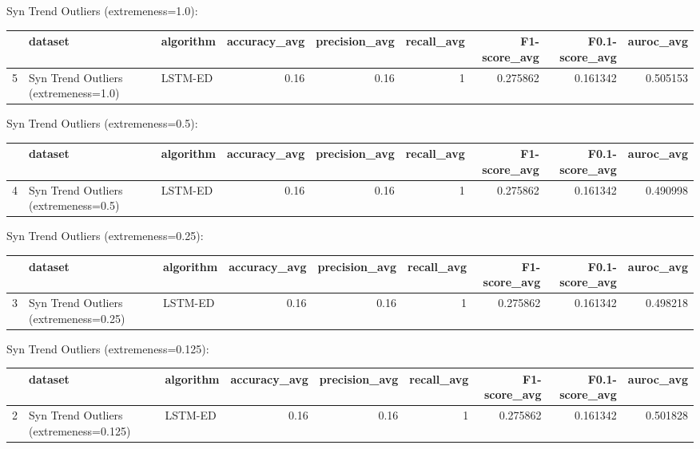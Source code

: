 Syn Trend Outliers (extremeness=1.0):

\begin{tabular}{rllrrrrrr}
\hline
    & dataset                              & algorithm   &   accuracy\_avg &   precision\_avg &   recall\_avg &   F1-score\_avg &   F0.1-score\_avg &   auroc\_avg \\
\hline
  5 & Syn Trend Outliers (extremeness=1.0) & LSTM-ED     &           0.16 &            0.16 &            1 &       0.275862 &         0.161342 &    0.505153 \\
\hline
\end{tabular}

Syn Trend Outliers (extremeness=0.5):

\begin{tabular}{rllrrrrrr}
\hline
    & dataset                              & algorithm   &   accuracy\_avg &   precision\_avg &   recall\_avg &   F1-score\_avg &   F0.1-score\_avg &   auroc\_avg \\
\hline
  4 & Syn Trend Outliers (extremeness=0.5) & LSTM-ED     &           0.16 &            0.16 &            1 &       0.275862 &         0.161342 &    0.490998 \\
\hline
\end{tabular}

Syn Trend Outliers (extremeness=0.25):

\begin{tabular}{rllrrrrrr}
\hline
    & dataset                               & algorithm   &   accuracy\_avg &   precision\_avg &   recall\_avg &   F1-score\_avg &   F0.1-score\_avg &   auroc\_avg \\
\hline
  3 & Syn Trend Outliers (extremeness=0.25) & LSTM-ED     &           0.16 &            0.16 &            1 &       0.275862 &         0.161342 &    0.498218 \\
\hline
\end{tabular}

Syn Trend Outliers (extremeness=0.125):

\begin{tabular}{rllrrrrrr}
\hline
    & dataset                                & algorithm   &   accuracy\_avg &   precision\_avg &   recall\_avg &   F1-score\_avg &   F0.1-score\_avg &   auroc\_avg \\
\hline
  2 & Syn Trend Outliers (extremeness=0.125) & LSTM-ED     &           0.16 &            0.16 &            1 &       0.275862 &         0.161342 &    0.501828 \\
\hline
\end{tabular}

